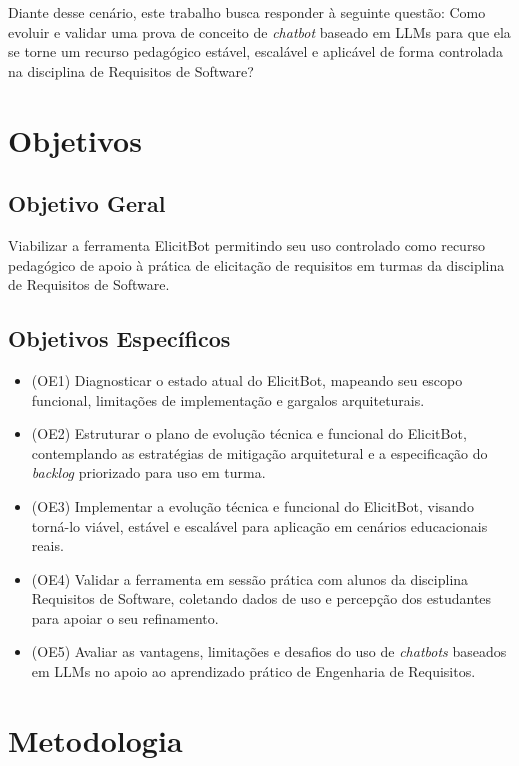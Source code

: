 Diante desse cenário, este trabalho busca responder à seguinte questão: Como evoluir e validar uma prova de conceito de \textit{chatbot} baseado em LLMs para que ela se torne um recurso pedagógico estável, escalável e aplicável de forma controlada na disciplina de Requisitos de Software?

\section{Objetivos}

\subsection{Objetivo Geral}

Viabilizar a ferramenta ElicitBot permitindo seu uso controlado como recurso pedagógico de apoio à prática de elicitação de requisitos em turmas da disciplina de Requisitos de Software.

\subsection{Objetivos Específicos}

\begin{itemize}
    \item (OE1) Diagnosticar o estado atual do ElicitBot, mapeando seu escopo funcional, limitações de implementação e gargalos arquiteturais.
    \item (OE2) Estruturar o plano de evolução técnica e funcional do ElicitBot, contemplando as estratégias de mitigação arquitetural e a especificação do \textit{backlog} priorizado para uso em turma.
    \item (OE3) Implementar a evolução técnica e funcional do ElicitBot, visando torná-lo viável, estável e escalável para aplicação em cenários educacionais reais.
    \item (OE4) Validar a ferramenta em sessão prática com alunos da disciplina Requisitos de Software, coletando dados de uso e percepção dos estudantes para apoiar o seu refinamento.
    \item (OE5) Avaliar as vantagens, limitações e desafios do uso de \textit{chatbots} baseados em LLMs no apoio ao aprendizado prático de Engenharia de Requisitos.
\end{itemize}

\section{Metodologia}

